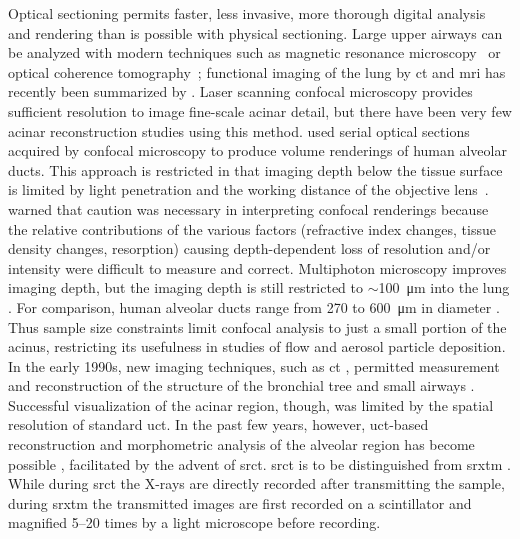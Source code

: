 Optical sectioning permits faster, less invasive, more thorough digital analysis and \threed rendering than is possible with physical sectioning. Large upper airways can be analyzed with modern techniques such as magnetic resonance microscopy~\cite{Hoffman1990,Sundaramoorthy1995} or optical coherence tomography~\cite{Hanna2005}; functional imaging of the lung by \ac{ct} and \ac{mri} has recently been summarized by \citet{VanBeek2008}. Laser scanning confocal microscopy provides sufficient resolution to image fine-scale acinar detail, but there have been very few \threed acinar reconstruction studies using this method. \citet{Cookson1993} used serial optical sections acquired by confocal microscopy to produce \threed volume renderings of human alveolar ducts. This approach is restricted in that imaging depth below the tissue surface is limited by light penetration and the working distance of the objective lens~\cite{Bonse1996}. \citet{Cookson1993} warned that caution was necessary in interpreting confocal \threed renderings because the relative contributions of the various factors (refractive index changes, tissue density changes, resorption) causing depth-dependent loss of resolution and/or intensity were difficult to measure and correct. Multiphoton microscopy improves imaging depth, but the imaging depth is still restricted to $\sim$\SI{100}{\micro\meter} into the lung \cite{Pena2007}. For comparison, human alveolar ducts range from 270 to \SI{600}{\micro\meter} in diameter \cite{Whimster1970}. Thus sample size constraints limit confocal analysis to just a small portion of the acinus, restricting its usefulness in studies of flow and aerosol particle deposition. In the early 1990s, new imaging techniques, such as \ac{ct} \cite{Brown1991,Mcnamara1992}, permitted measurement and reconstruction of the \threed structure of the bronchial tree and small airways \cite{Aykac2003,Higgins1998,Park1998,Reinhardt1997,Sauret2002,Sera2003,Wood1995,Wood1995a}. Successful visualization of the acinar region, though, was limited by the spatial resolution of standard \ac{uct}. In the past few years, however, \ac{uct}-based \threed reconstruction and morphometric analysis of the alveolar region has become possible \cite{Langheinrich2004,Litzlbauer2006,Watz2005}, facilitated by the advent of \ac{srct}. \ac{srct} is to be distinguished from \ac{srxtm} \cite{Schittny2008,Stampanoni2002,Stampanoni2007}. While during \ac{srct} the X-rays are directly recorded after transmitting the sample, during \ac{srxtm} the transmitted images are first recorded on a scintillator and magnified 5--20 times by a light microscope before recording.

